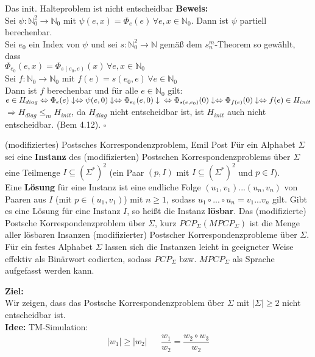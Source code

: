 \begin{satz}{Das init. Halteproblem ist nicht entscheidbar}
    \textbf{Beweis:}\\
    Sei $\psi : \mathbb{N}_0^2 \rightarrow \mathbb{N}_0$ mit $\psi(e,x) = \Phi_e(e) \, \forall e,x \in \mathbb{N}_0$. Dann ist $\psi$ partiell berechenbar. \\
    Sei $e_0$ ein Index von $\psi$ und sei $s:\mathbb{N}_0^2 \rightarrow \mathbb{N}$ gemäß dem $s^m_n$-Theorem so gewählt, 
    dass \\ $\Phi_{e_0}(e,x) = \Phi_{s(e_0,e)}(x) \, \forall e,x \in \mathbb{N}_0$ \\
    Sei $f: \mathbb{N}_0 \rightarrow \mathbb{N}_0$ mit $f(e) = s(e_0,e) \, \forall e\in \mathbb{N}_0$ \\

    Dann ist $f$ berechenbar und für alle $e \in \mathbb{N}_0$ gilt:\\
    $e \in H_{diag} \Leftrightarrow \Phi_e(e)\downarrow \Leftrightarrow \psi(e,0)\downarrow \Leftrightarrow \Phi_{e_0}(e,0)\downarrow \\
    \Leftrightarrow \Phi_{s(e,e_0)}(0)\downarrow \Leftrightarrow \Phi_{f(e)}(0)\downarrow \Leftrightarrow f(e) \in H_{init}$ \\

    $\Rightarrow H_{diag} \leq_m H_{init}$, da $H_{diag}$ nicht entscheidbar ist, ist $H_{init}$ auch nicht entscheidbar. (Bem 4.12). $\square$
\end{satz}

\begin{defn}{(modifiziertes) Postsches Korrespondenzproblem, Emil Post}
    Für ein Alphabet $\Sigma$ sei eine \textbf{Instanz} des (modifizierten) Postschen Korrespondenzproblems über $\Sigma$ eine Teilmenge $I \subseteq (\Sigma^*)^2$ 
    (ein Paar $(p, I)$ mit $I \subseteq (\Sigma^*)^2$ und $p \in I$). \\

    Eine \textbf{Lösung} für eine Instanz ist eine endliche Folge $(u_1,v_1)...(u_n,v_n)$ von Paaren aus $I$ (mit $p \in (u_1,v_1)$) mit $n \geq 1$, sodass
    $u_1 \circ ... \circ u_n = v_1...v_n$ gilt. Gibt es eine Lösung für eine Instanz $I$, so heißt die Instanz \textbf{lösbar}. Das (modifizierte) Postsche 
    Korrespondenzproblem über $\Sigma$, kurz $PCP_\Sigma (MPCP_\Sigma)$ ist die Menge aller lösbaren Insanzen (modifizierter) Postscher Korrespondenzprobleme 
    über $\Sigma$. \\

    Für ein festes Alphabet $\Sigma$ lassen sich die Instanzen leicht in geeigneter Weise effektiv als Binärwort codierten, sodass $PCP_\Sigma$ bzw. $MPCP_\Sigma$ 
    als Sprache aufgefasst werden kann.
\end{defn}

\textbf{Ziel:} \\
Wir zeigen, dass das Postsche Korrespondenzproblem über $\Sigma$ mit $|\Sigma| \geq 2$ nicht entscheidbar ist. \\

\textbf{Idee:} TM-Simulation: \\
\begin{align*}
    |w_1| \geq |w_2| && \dfrac{w_1}{w_2} = \dfrac{w_2 \circ w_3}{w_2} \\
\end{align*}
